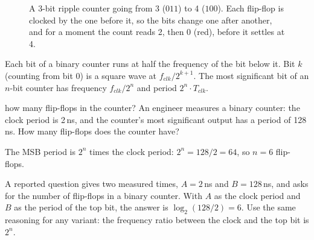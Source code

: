 \begin{figure}[h]
\centering
{}
\caption{A 3-bit ripple counter going from 3 ($011$) to 4 ($100$). Each flip-flop is clocked by the one before it, so the bits change one after another, and for a moment the count reads 2, then 0 (red), before it settles at 4.}
\label{fig:ripplecount}
\end{figure}

\begin{bigidea}
Each bit of a binary counter runs at half the frequency of the bit below it. Bit $k$ (counting from bit 0) is a square wave at $f_{clk}/2^{k+1}$. The most significant bit of an $n$-bit counter has frequency $f_{clk}/2^n$ and period $2^n \cdot T_{clk}$.
\end{bigidea}

\begin{worked}{how many flip-flops in the counter?}
An engineer measures a binary counter: the clock period is 2\,ns, and the counter's most significant output has a period of 128\,ns. How many flip-flops does the counter have?

The MSB period is $2^n$ times the clock period: $2^n = 128/2 = 64$, so $n = 6$ flip-flops.
\end{worked}

\begin{onoa}
A reported question gives two measured times, $A = 2$\,ns and $B = 128$\,ns, and asks for the number of flip-flops in a binary counter. With $A$ as the clock period and $B$ as the period of the top bit, the answer is $\log_2(128/2) = 6$. Use the same reasoning for any variant: the frequency ratio between the clock and the top bit is $2^n$.
\end{onoa}

